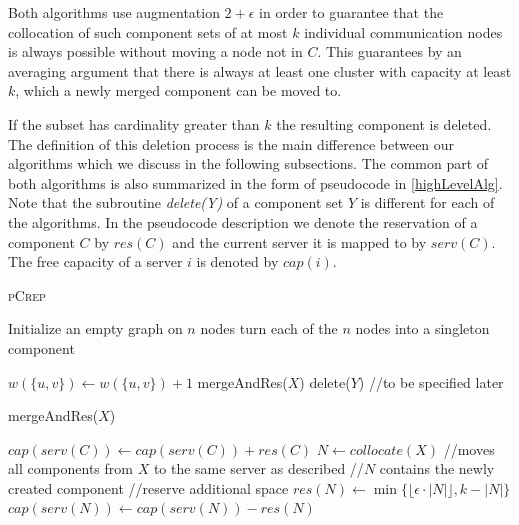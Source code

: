 \documentclass[a4paper,UKenglish,cleveref, autoref, thm-restate,authorcolumns]{lipics-v2019}
\newcommand{\adjDel}{\textsc{pCrep}}
\begin{document}
Both algorithms use augmentation $2+\epsilon$ in order to guarantee that the collocation of such component sets of at most $k$ individual communication nodes is always possible without moving a node not in $C$. This guarantees by an averaging argument that there is always at least one cluster with capacity at least $k$, which a newly merged component can be moved to.

If the subset has cardinality greater than $k$ the resulting component is deleted. The definition of this deletion process is the main difference between our algorithms which we discuss in the following subsections. The common part of both algorithms is also summarized in the form of pseudocode in \cref{highLevelAlg}. Note that the subroutine \textit{delete(Y)} of a component set $Y$ is different for each of the algorithms. 
In the pseudocode description we denote the reservation of a component $C$ by $res(C)$ and the current server it is mapped to by $serv(C)$. The free capacity of a server $i$ is denoted by $cap(i)$.

\begin{algorithm}[t]
	\caption{\adjDel{}}
	\label{highLevelAlg}
	\begin{algorithmic}
		\STATE Initialize an empty graph on $n$ nodes
		\STATE turn each of the $n$ nodes into a singleton component
		
		\STATE $w(\{u,v\})\gets w(\{u,v\})+1$
		\ENDIF
		\STATE mergeAndRes($X$)
		\ENDIF
		\STATE delete($Y$) //to be specified later
		\ENDIF	
		
		\ENDFOR
		
	\end{algorithmic}
\end{algorithm}

\begin{algorithm}[t]
	\caption{mergeAndRes($X$)}
	\label{mergeAndRes}
	\begin{algorithmic}
		\FORALL { $C\in X$}
		\STATE $cap(serv(C))\gets cap(serv(C))+res(C)$		
		\ENDFOR
		\STATE $N\gets collocate(X)$ //moves all components from $X$ to the same server as described
		\STATE //$N$ contains the newly created component
		\IF {$|N|>2/\epsilon$}
		\STATE //reserve additional space
		\STATE $res(N)\gets\min\{\lfloor\epsilon\cdot|N|\rfloor,k-|N|\}$
		\STATE $cap(serv(N))\gets cap(serv(N))-res(N)$
		\ENDIF	
		
		
	\end{algorithmic}
\end{algorithm}
\end{document}
